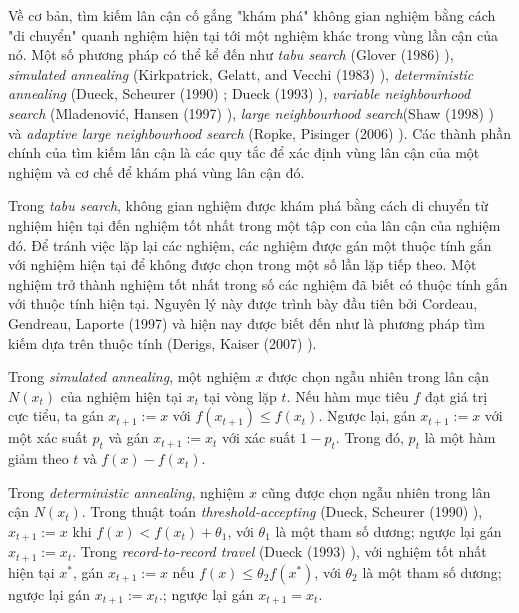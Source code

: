Về cơ bản, tìm kiếm lân cận cố gắng "khám phá" không gian nghiệm bằng cách "di chuyển" quanh nghiệm hiện tại tới một nghiệm khác trong vùng lần cận của nó. Một số phương pháp có thể kể đến như \textit{tabu search} (Glover (1986) \cite{glover1986future}), \textit{simulated annealing} (Kirkpatrick, Gelatt, and Vecchi
(1983) \cite{kirkpatrick1983optimization}), \textit{deterministic annealing} (Dueck, Scheurer
(1990) \cite{dueck1990threshold}; Dueck (1993) \cite{dueck1993new}), \textit{variable neighbourhood search} (Mladenović, Hansen (1997) \cite{mladenovic1997variable}), \textit{large neighbourhood search}(Shaw (1998) \cite{shaw1998using}) và \textit{adaptive large neighbourhood search} (Ropke, Pisinger (2006) \cite{ropke2006adaptive}). Các thành phần chính của tìm kiếm lân cận là các quy tắc để xác định vùng lân cận của một nghiệm và cơ chế để khám phá vùng lân cận đó.

Trong \textit{tabu search}, không gian nghiệm được khám phá bằng cách di chuyển từ nghiệm hiện tại đến nghiệm tốt nhất trong một tập con của lân cận của nghiệm đó. Để tránh việc lặp lại các nghiệm, các nghiệm được gán một thuộc tính gắn với nghiệm hiện tại để không được chọn trong một số lần lặp tiếp theo. Một nghiệm trở thành nghiệm tốt nhất trong số các nghiệm đã biết có thuộc tính gắn với thuộc tính hiện tại. Nguyên lý này được trình bày đầu tiên bởi Cordeau, Gendreau, Laporte (1997) \cite{cordeau1997tabu} và hiện nay được biết đến như là phương pháp tìm kiếm dựa trên thuộc tính (Derigs, Kaiser (2007) \cite{derigs2007applying}).

Trong \textit{simulated annealing}, một nghiệm $x$ được chọn ngẫu nhiên trong lân cận $N(x_t)$ của nghiệm hiện tại $x_t$ tại vòng lặp $t$. Nếu hàm mục tiêu $f$ đạt giá trị cực tiểu, ta gán $x_{t+1}:=x$ với $f(x_{t+1}) \leq f(x_t)$. Ngược lại, gán $x_{t+1}:=x$ với một xác suất $p_t$ và gán $x_{t+1}:=x_t$ với xác suất $1-p_t$. Trong đó, $p_t$ là một hàm giảm theo $t$ và $f(x) - f(x_t)$.

Trong \textit{deterministic annealing}, nghiệm $x$ cũng được chọn ngẫu nhiên trong lân cận $N(x_t)$. Trong thuật toán \textit{threshold-accepting} (Dueck, Scheurer (1990) \cite{dueck1990threshold}), $x_{t+1}:=x$ khi $f(x) < f(x_t) + \theta_1$, với $\theta_1$ là một tham số dương; ngược lại gán $x_{t+1}:=x_t$. Trong \textit{record-to-record travel} (Dueck (1993) \cite{dueck1993new}), với nghiệm tốt nhất hiện tại $x^*$, gán $x_{t+1}:=x$ nếu $f(x) \leq \theta_2 f(x^*)$, với $\theta_2$ là một tham số dương; ngược lại gán $x_{t+1}:=x_t$.; ngược lại gán $x_{t+1}=x_t$.

